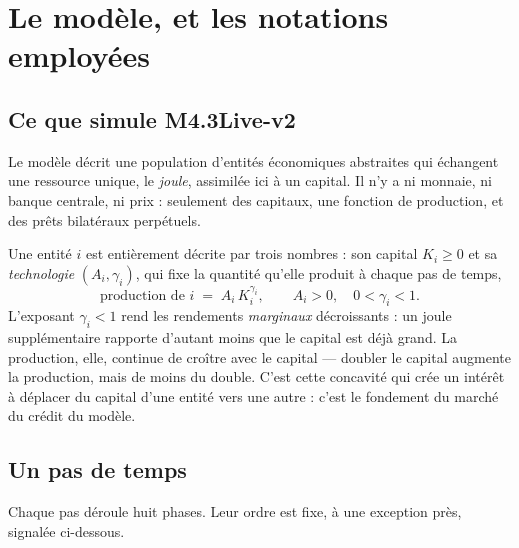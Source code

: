 \section{Le modèle, et les notations employées}
\label{sec:modele}

\subsection{Ce que simule M4.3Live-v2}

Le modèle décrit une population d'entités économiques abstraites qui
échangent une ressource unique, le \emph{joule}, assimilée ici à un capital.
Il n'y a ni monnaie, ni banque centrale, ni prix : seulement des capitaux,
une fonction de production, et des prêts bilatéraux perpétuels.

Une entité $i$ est entièrement décrite par trois nombres : son capital
$K_i \ge 0$ et sa \emph{technologie} $(A_i, \gamma_i)$, qui fixe la quantité
qu'elle produit à chaque pas de temps,
\begin{equation}
\text{production de } i \;=\; A_i\,K_i^{\gamma_i},
\qquad A_i > 0,\quad 0 < \gamma_i < 1 .
\label{eq:production}
\end{equation}
L'exposant $\gamma_i < 1$ rend les rendements \emph{marginaux} décroissants :
un joule supplémentaire rapporte d'autant moins que le capital est déjà
grand. La production, elle, continue de croître avec le capital --- doubler
le capital augmente la production, mais de moins du double. C'est cette
concavité qui crée un intérêt à déplacer du capital d'une entité vers une
autre : c'est le fondement du marché du crédit du modèle.

\subsection{Un pas de temps}
\label{sec:phases}

Chaque pas déroule huit phases. Leur ordre est fixe, à une exception près,
signalée ci-dessous.

